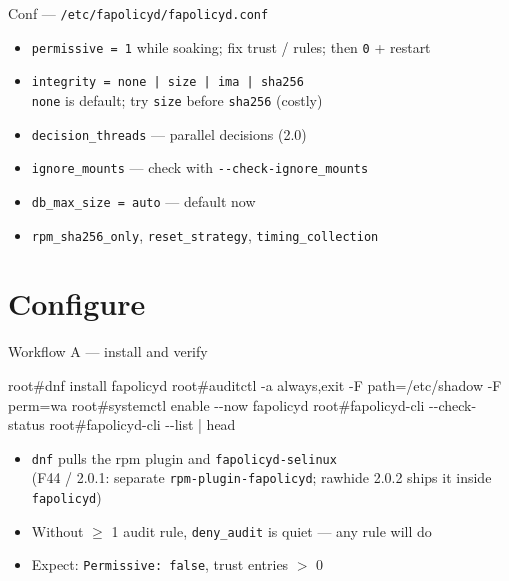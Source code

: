 \documentclass[aspectratio=169,11pt]{beamer}
\newcommand{\rootp}{\textcolor{rootc}{root\#}}
\newcommand{\dd}{-{}-}
\begin{document}
\begin{frame}{Conf --- \texttt{/etc/fapolicyd/fapolicyd.conf}}
  \begin{itemize}
    \item \texttt{permissive = 1} while soaking; fix trust / rules; then \texttt{0} + restart
    \item \texttt{integrity = none | size | ima | sha256}\\
          {\small \texttt{none} is default; try \texttt{size} before \texttt{sha256} (costly)}
    \item \texttt{decision\_threads} --- parallel decisions (2.0)
    \item \texttt{ignore\_mounts} --- check with \texttt{\dd check-ignore\_mounts}
    \item \texttt{db\_max\_size = auto} --- default now
    \item \texttt{rpm\_sha256\_only}, \texttt{reset\_strategy}, \texttt{timing\_collection}
  \end{itemize}
\end{frame}

\section{Configure}

\begin{frame}[fragile]{Workflow A --- install and verify}
  \begin{semiverbatim}
\rootp dnf install fapolicyd
\rootp auditctl -a always,exit -F path=/etc/shadow -F perm=wa
\rootp systemctl enable \dd{}now fapolicyd
\rootp fapolicyd-cli \dd{}check-status
\rootp fapolicyd-cli \dd{}list | head
  \end{semiverbatim}
  \begin{itemize}
    \item \texttt{dnf} pulls the rpm plugin and \texttt{fapolicyd-selinux}\\
          {\small (F44 / 2.0.1: separate \texttt{rpm-plugin-fapolicyd};
          rawhide 2.0.2 ships it inside \texttt{fapolicyd})}
    \item Without $\ge$ 1 audit rule, \texttt{deny\_audit} is quiet --- any rule will do
    \item Expect: \texttt{Permissive: false}, trust entries $>$ 0
  \end{itemize}
\end{frame}
\end{document}
